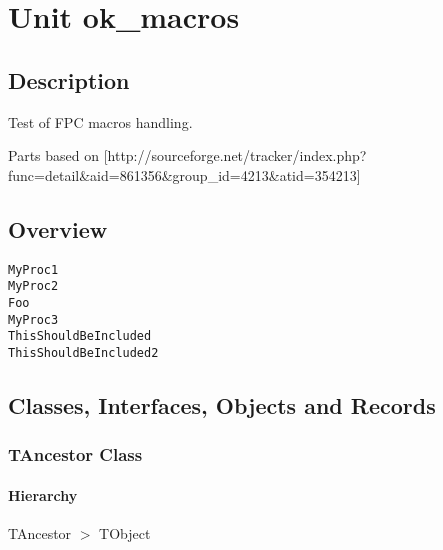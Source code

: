 \documentclass{report}
\begin{document}
\newlength{\tmplength}
\chapter{Unit ok{\_}macros}
\section{Description}
Test of FPC macros handling.\hfill\vspace*{1ex}



Parts based on [http://sourceforge.net/tracker/index.php?func=detail{\&}aid=861356{\&}group{\_}id=4213{\&}atid=354213]
\section{Overview}
\begin{description}
\item[\texttt{\begin{ttfamily}TAncestor\end{ttfamily} Class}]
\item[\texttt{\begin{ttfamily}TMyClass\end{ttfamily} Class}]
\end{description}
\begin{description}
\item[\texttt{MyProc1}]
\item[\texttt{MyProc2}]
\item[\texttt{Foo}]
\item[\texttt{MyProc3}]
\item[\texttt{ThisShouldBeIncluded}]
\item[\texttt{ThisShouldBeIncluded2}]
\end{description}
\section{Classes, Interfaces, Objects and Records}
\subsection*{TAncestor Class}
\subsubsection*{\large{\textbf{Hierarchy}}\normalsize\hspace{1ex}\hfill}
TAncestor {$>$} TObject
\end{document}
